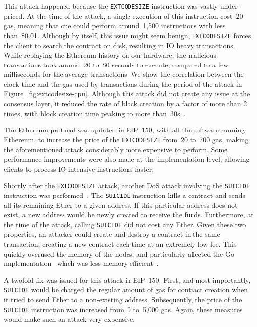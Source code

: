 This attack happened because the \lstinline{EXTCODESIZE} instruction was vastly under-priced. At the time of the attack, a single execution of this instruction cost~20 gas, meaning that one could perform around~1,500 instructions with less than~\$0.01. Although by itself, this issue might seem benign, \lstinline{EXTCODESIZE} forces the client to search the contract on disk, resulting in IO heavy transactions. While replaying the Ethereum history on our hardware, the malicious transactions took around~20 to~80 seconds to execute, compared to a few milliseconds for the average transactions. We show the correlation between the clock time and the gas used by transactions during the period of the attack in Figure~\ref{fig:extcodesize-cpu}. Although this attack did not create any issue at the consensus layer, it reduced the rate of block creation by a factor of more than 2 times, with block creation time peaking to more than~30s~\cite{block-time-chart}.

The Ethereum protocol was updated in EIP~150, with all the software running Ethereum, to increase the price of the \lstinline{EXTCODESIZE} from~20 to~700 gas, making the aforementioned attack considerably more expensive to perform. Some performance improvements were also made at the implementation level, allowing clients to process IO-intensive instructions faster.

Shortly after the \lstinline{EXTCODESIZE} attack, another DoS attack involving the \lstinline{SUICIDE} instruction was performed~\cite{suicide-attack}. The \lstinline{SUICIDE} instruction kills a contract and sends all its remaining Ether to a given address. If this particular address does not exist, a new address would be newly created to receive the funds. Furthermore, at the time of the attack, calling \lstinline{SUICIDE} did not cost any Ether. Given these two properties, an attacker could create and destroy a contract in the same transaction, creating a new contract each time at an extremely low fee. This quickly overused the memory of the nodes, and particularly affected the Go implementation~\cite{geth} which was less memory efficient~\cite{geth-memory-efficiency}.

A twofold fix was issued for this attack in EIP~150. First, and most importantly, \lstinline{SUICIDE} would be charged the regular amount of gas for contract creation when it tried to send Ether to a non-existing address. Subsequently, the price of the \lstinline{SUICIDE} instruction was increased from~0 to~5,000 gas. Again, these measures would make such an attack very expensive.
